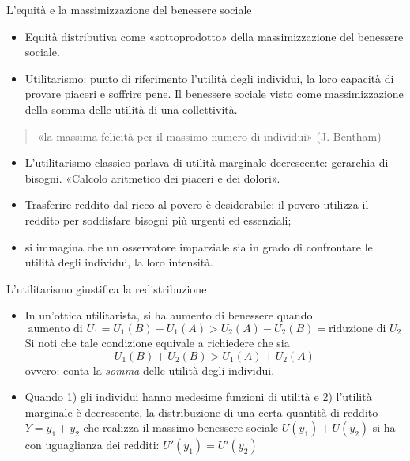 \documentclass[aspectratio=64,12pt]{beamer}
\begin{document}
\begin{frame}{L'equità e la massimizzazione del benessere sociale}
\begin{itemize}
\item \alert{Equità distributiva} come «sottoprodotto» della massimizzazione del
benessere sociale.
\item \alert{Utilitarismo}: punto di riferimento l'utilità degli individui, la loro
capacità di provare piaceri e soffrire pene. Il benessere sociale visto come
massimizzazione della somma delle utilità di una collettività.
\end{itemize}
\begin{quote}
«la massima felicità per il massimo numero di individui» (J. Bentham)
\end{quote}
\begin{itemize}
\item L'utilitarismo classico parlava di utilità marginale decrescente: gerarchia
di bisogni. «Calcolo aritmetico dei piaceri e dei dolori».
\item Trasferire reddito dal ricco al povero è desiderabile: il povero utilizza il
reddito per soddisfare bisogni più urgenti ed essenziali;
\item si immagina che un osservatore imparziale sia in grado di confrontare le
utilità degli individui, la loro intensità.
\end{itemize}
\end{frame}

\begin{frame}{L'utilitarismo giustifica la redistribuzione}
\begin{itemize}
\item In un'ottica utilitarista, si ha aumento di benessere quando 
\begin{equation*}
\text{aumento di $U_{1}$} = U_{1}(B)-U_{1}(A) > U_{2}(A)-U_{2}(B) =
\text{riduzione di $U_{2}$}
\end{equation*}
Si noti che tale condizione equivale a richiedere che sia
\begin{equation*}
U_{1}(B)+U_{2}(B) >  U_{1}(A)+U_{2}(A)
\end{equation*}
ovvero: conta la \emph{somma} delle utilità degli individui.
\item Quando 1) gli individui hanno medesime funzioni di utilità e 2) l'utilità
marginale è decrescente, la distribuzione di una certa quantità di reddito
$Y=y_1+y_2$ che realizza il massimo benessere sociale $U(y_1)+U(y_2)$ si ha con
uguaglianza dei redditi: $U'(y_{1})=U'(y_{2})$
\end{itemize}
\end{frame}
\end{document}
